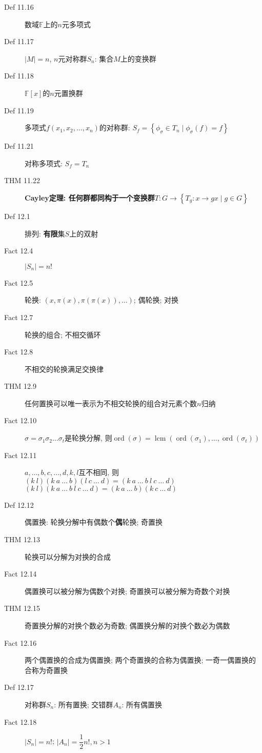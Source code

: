 \documentclass{article}
\renewcommand{\l}{\left}
\renewcommand{\r}{\right}
\newcommand{\ord}{\operatorname{ord}}
\newcommand{\lcm}{\operatorname{lcm}}
\begin{document}
\begin{description}
        \item[Def 11.16] 数域$\mathbb F$上的$n$元多项式
        \item[Def 11.17] $\l|M\r| = n$, $n$元对称群$S_n$: 集合$M$上的变换群
        \item[Def 11.18] $\mathbb F[x]$的$n$元置换群
        \item[Def 11.19] 多项式$f(x_1, x_2, \dots, x_n)$的对称群: $S_f = \l\{ \phi_\sigma \in T_n \mid \phi_\sigma(f) = f \r\}$
        \item[Def 11.21] 对称多项式: $S_f = T_n$
        \item[THM 11.22] \textbf{Cayley定理: 任何群都同构于一个变换群}\hfill$T: G \to \l\{ T_g : x \to gx \mid g \in G \r\}$
        \item[Def 12.1] 排列: \textbf{有限}集$S$上的双射
        \item[Fact 12.4] $\l| S_n \r| = n!$
        \item[Fact 12.5] 轮换: $(x, \pi(x), \pi(\pi(x)), \dots)$; 偶轮换; 对换
        \item[Fact 12.7] 轮换的组合; 不相交循环
        \item[Fact 12.8] 不相交的轮换满足交换律
        \item[THM 12.9] 任何置换可以唯一表示为不相交轮换的组合\hfill 对元素个数$n$归纳
        \item[Fact 12.10] $\sigma = \sigma_1\sigma_2\dots\sigma_t$是轮换分解, 则$\ord(\sigma) = \lcm(\ord(\sigma_1), \dots, \ord(\sigma_t))$
        \item[Fact 12.11] $a, \dots, b, c, \dots, d, k, l$互不相同, 则\\$(k~l)(k~a~\dots~b)(l~c~\dots~d) = (k~a~\dots~b~l~c~\dots~d)$\\$(k~l)(k~a~\dots~b~l~c~\dots~d) = (k~a~\dots~b)(k~c~\dots~d)$
        \item[Def 12.12] 偶置换: 轮换分解中有偶数个\textbf{偶}轮换; 奇置换
        \item[THM 12.13] 轮换可以分解为对换的合成
        \item[Fact 12.14] 偶置换可以被分解为偶数个对换; 奇置换可以被分解为奇数个对换
        \item[THM 12.15] 奇置换分解的对换个数必为奇数; 偶置换分解的对换个数必为偶数
        \item[Fact 12.16] 两个偶置换的合成为偶置换; 两个奇置换的合称为偶置换; 一奇一偶置换的合称为奇置换
        \item[Def 12.17] 对称群$S_n$: 所有置换; 交错群$A_n$: 所有偶置换
        \item[Fact 12.18] $\l|S_n\r| = n!$; $|A_n| = \dfrac{1}{2} n!, n > 1$
    \end{description}
\end{document}
